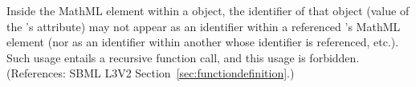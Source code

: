 Inside the  MathML element within a \FunctionDefinition
object, the identifier of that object (\ie value of the
\FunctionDefinition's  attribute) may not appear as an identifier within a referenced \FunctionDefinition's  MathML element (nor as an identifier within another \FunctionDefinition whose identifier is referenced, etc.).  Such usage entails a recursive function call, and this usage is forbidden.  (References: SBML L3V2
Section~\ref{sec:functiondefinition}.)
